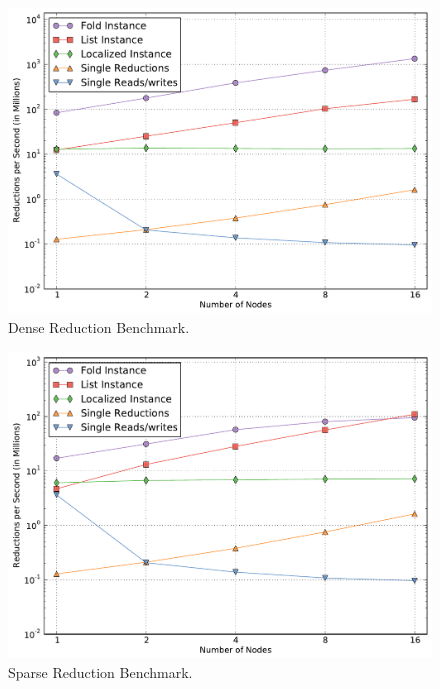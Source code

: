 \begin{figure}
\begin{center}
\includegraphics[scale=0.33]{figs/reduce_dense.pdf}
\end{center}
\vspace{-6mm}
\caption{Dense Reduction Benchmark.\label{fig:reducdense}}
\vspace{-4mm}
\end{figure}

\begin{figure}
\begin{center}
\includegraphics[scale=0.33]{figs/reduce_sparse.pdf}
\end{center}
\vspace{-6mm}
\caption{Sparse Reduction Benchmark.\label{fig:reducsparse}}
\vspace{-4mm}
\end{figure}

